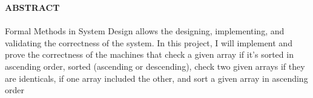 \begin{center}
\thispagestyle{empty}
\vspace{2cm}
\LARGE{\textbf{ABSTRACT}}\\[1.0cm]
\end{center}
\thispagestyle{empty}
\large{\paragraph{}
Formal Methods in System Design allows the designing, implementing, and validating the correctness of the system. In this project, I will implement and prove the correctness of the machines that check a given array if it's sorted in ascending order, sorted (ascending or descending), check two given arrays if they are identicals, if one array included the other, and sort a given array in ascending order
}